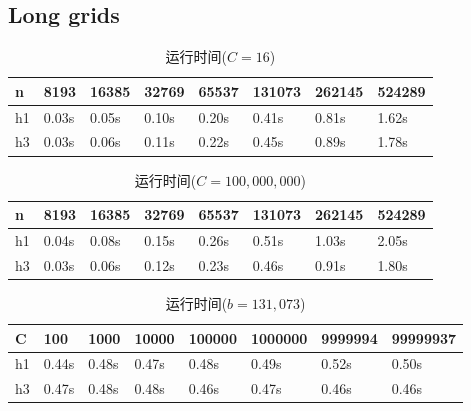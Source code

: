 \subsection{Long grids}
\begin{table}[H]
  \caption{运行时间($C=16$)}
  \label{tab22}
  \centering
  \begin{tabular}{p{1.5cm}<{\centering}p{1.5cm}<{\centering}p{1.5cm}<{\centering}p{1.5cm}<{\centering}p{1.5cm}<{\centering}p{1.5cm}<{\centering}p{1.5cm}<{\centering}p{1.5cm}<{\centering}}
  \toprule
   n & 8193 & 16385 & 32769 & 65537 & 131073 &262145 &524289\\
  \midrule
   h1  & 0.03s & 0.05s & 0.10s & 0.20s & 0.41s & 0.81s & 1.62s \\
   h3  & 0.03s & 0.06s & 0.11s & 0.22s & 0.45s & 0.89s & 1.78s \\
  \bottomrule
  \end{tabular} 
\end{table}
\begin{table}[H]
  \caption{运行时间($C=100,000,000$)}
  \label{tab23}
  \centering
  \begin{tabular}{p{1.5cm}<{\centering}p{1.5cm}<{\centering}p{1.5cm}<{\centering}p{1.5cm}<{\centering}p{1.5cm}<{\centering}p{1.5cm}<{\centering}p{1.5cm}<{\centering}p{1.5cm}<{\centering}}
  \toprule
   n & 8193 & 16385 & 32769 & 65537 & 131073 &262145 &524289\\
  \midrule
   h1  & 0.04s & 0.08s & 0.15s & 0.26s & 0.51s & 1.03s & 2.05s \\
   h3  & 0.03s & 0.06s & 0.12s & 0.23s & 0.46s & 0.91s & 1.80s \\
  \bottomrule
  \end{tabular} 
\end{table}
\begin{table}[H]
  \caption{运行时间($b=131,073$)}
  \label{tab24}
  \centering
  \begin{tabular}{p{1.5cm}<{\centering}p{1.5cm}<{\centering}p{1.5cm}<{\centering}p{1.5cm}<{\centering}p{1.5cm}<{\centering}p{1.5cm}<{\centering}p{1.5cm}<{\centering}p{1.5cm}<{\centering}}
  \toprule
   C & 100 & 1000 & 10000 & 100000 & 1000000 &9999994 & 99999937\\
  \midrule
   h1  & 0.44s & 0.48s & 0.47s & 0.48s & 0.49s & 0.52s & 0.50s \\
   h3  & 0.47s & 0.48s & 0.48s & 0.46s & 0.47s & 0.46s & 0.46s \\
  \bottomrule
  \end{tabular} 
\end{table}

